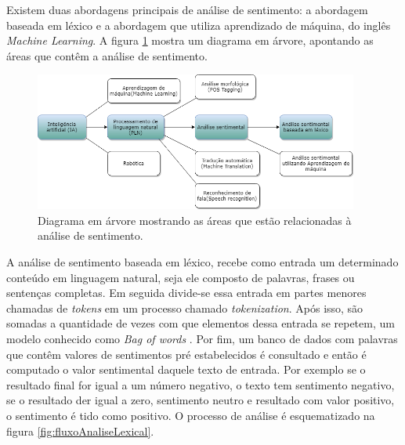 Existem duas abordagens principais de análise de sentimento: a abordagem baseada em léxico e a abordagem que utiliza aprendizado de máquina, do inglês \textit{Machine Learning}. A figura \ref{fig:arvoreAnaliseSentimental} mostra um diagrama em árvore, apontando as áreas que contêm a análise de sentimento.

\begin{figure}[h]
    \centering
    \includegraphics[width=0.95\textwidth]{imagens/arvoreAnaliseSentimental.png}
    \caption {Diagrama em árvore mostrando as áreas que estão relacionadas à análise de sentimento.}
    \label{fig:arvoreAnaliseSentimental}
\end{figure}

A análise de sentimento baseada em léxico, recebe como entrada um determinado conteúdo em linguagem natural, seja ele composto de palavras, frases ou sentenças completas. Em seguida divide-se essa entrada em partes menores chamadas de \textit{tokens} em um processo chamado \textit{tokenization}. Após isso, são somadas a quantidade de vezes com que elementos dessa entrada se repetem, um modelo conhecido como \textit{Bag of words} \cite{bagOfWords}. Por fim, um banco de dados com palavras que contêm valores de sentimentos pré estabelecidos é consultado e então é computado o valor sentimental daquele texto de entrada. Por exemplo se o resultado final for igual a um número negativo, o texto tem sentimento negativo, se o resultado der igual a zero, sentimento neutro e resultado com valor positivo, o sentimento é tido como positivo. O processo de análise é esquematizado na figura \ref{fig:fluxoAnaliseLexical}. 

